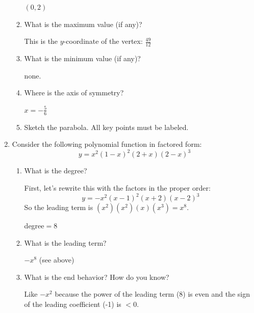 \documentclass[letterpaper,12pt,fleqn]{article}
\begin{document}
\begin{enumerate}
\begin{enumerate}
    $(0,2)$
    
  \item What is the maximum value (if any)?

    This is the $y$-coordinate of the vertex: $\frac{49}{12}$
    
  \item What is the minimum value (if any)?

    none.
    
  \item Where is the axis of symmetry?

    $x=-\frac{5}{6}$
    
  \item Sketch the parabola. All key points must be labeled.

  \end{enumerate}

\item Consider the following polynomial function in factored form:
  \[y=x^2(1-x)^2(2+x)(2-x)^3\]
  \begin{enumerate}
  \item What is the degree?

    First, let's rewrite this with the factors in the proper order:
    \[y=-x^2(x-1)^2(x+2)(x-2)^3\]
    So the leading term is $(x^2)(x^2)(x)(x^3)=x^8$.

    degree$=8$
    
  \item What is the leading term?

    $-x^8$ (see above)

  \item What is the end behavior? How do you know?

    Like $-x^2$ because the power of the leading term (8) is even and the sign
    of the leading coefficient (-1) is $<0$.
    

\end{enumerate}
\end{enumerate}
\end{document}
